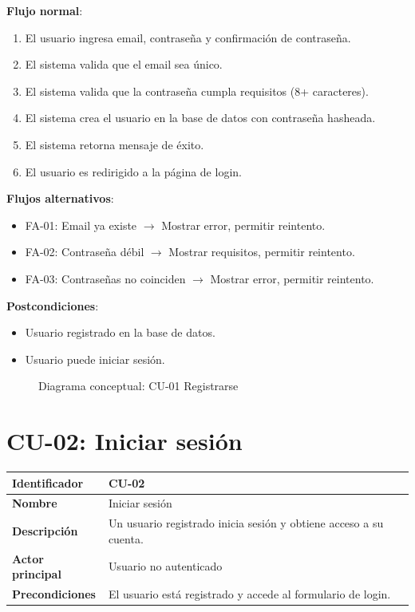 \documentclass[12pt,a4paper]{article}
\begin{document}
\textbf{Flujo normal}:
\begin{enumerate}[leftmargin=*]
    \item El usuario ingresa email, contrase\~na y confirmaci\'on de contrase\~na.
    \item El sistema valida que el email sea \'unico.
    \item El sistema valida que la contrase\~na cumpla requisitos (8+ caracteres).
    \item El sistema crea el usuario en la base de datos con contrase\~na hasheada.
    \item El sistema retorna mensaje de \'exito.
    \item El usuario es redirigido a la p\'agina de login.
\end{enumerate}

\textbf{Flujos alternativos}:
\begin{itemize}[leftmargin=*]
    \item FA-01: Email ya existe $\rightarrow$ Mostrar error, permitir reintento.
    \item FA-02: Contrase\~na d\'ebil $\rightarrow$ Mostrar requisitos, permitir reintento.
    \item FA-03: Contrase\~nas no coinciden $\rightarrow$ Mostrar error, permitir reintento.
\end{itemize}

\textbf{Postcondiciones}:
\begin{itemize}[leftmargin=*]
    \item Usuario registrado en la base de datos.
    \item Usuario puede iniciar sesi\'on.
\end{itemize}

\begin{figure}[h]
\centering
{}
\caption{Diagrama conceptual: CU-01 Registrarse}
\end{figure}

\newpage

\section{CU-02: Iniciar sesi\'on}

\begin{tabular}{|p{3.5cm}|p{10cm}|}
\hline
\textbf{Identificador} & CU-02 \\
\hline
\textbf{Nombre} & Iniciar sesi\'on \\
\hline
\textbf{Descripci\'on} & Un usuario registrado inicia sesi\'on y obtiene acceso a su cuenta. \\
\hline
\textbf{Actor principal} & Usuario no autenticado \\
\hline
\textbf{Precondiciones} & El usuario est\'a registrado y accede al formulario de login. \\
\hline
\end{tabular}
\end{document}
